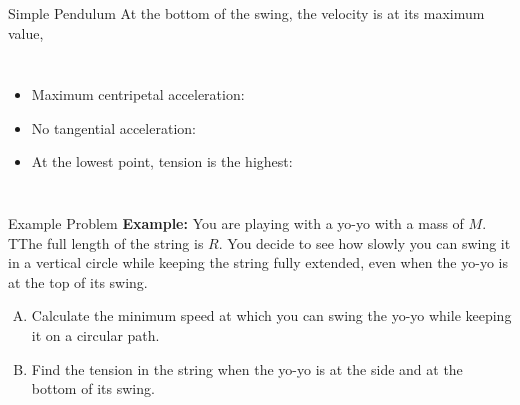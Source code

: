 \documentclass[12pt,compress,aspectratio=169]{beamer}
\begin{document}
\begin{frame}{Simple Pendulum}
  At the bottom of the swing, the velocity is at its maximum value,
  
  \vspace{.1in}\begin{columns}

    \begin{itemize}
    \item Maximum centripetal acceleration:

    \item No tangential acceleration:

    \item At the lowest point, tension is the highest:

    \end{itemize}
  \end{columns}
\end{frame}



\begin{frame}{Example Problem}
  \textbf{Example:} You are playing with a yo-yo with a mass of $M$. TThe
  full length of the string is $R$. You decide to see how slowly you can swing
  it in a vertical circle while keeping the string fully extended, even when
  the yo-yo is at the top of its swing.
  \begin{enumerate}[A.]
  \item Calculate the minimum speed at which you can swing the yo-yo while
    keeping it on a circular path.
  \item Find the tension in the string when the yo-yo is at the side and at the
    bottom of its swing. 
  \end{enumerate}
\end{frame}
\end{document}
